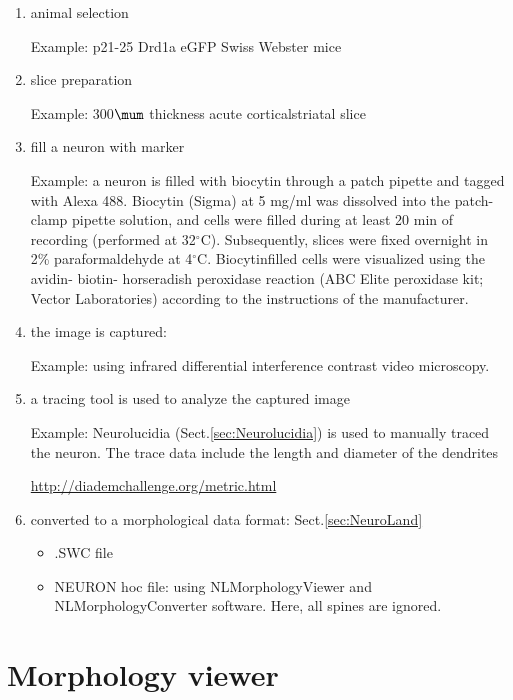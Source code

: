 \begin{enumerate}
  \item animal selection
  
Example: p21-25 Drd1a eGFP Swiss Webster mice
  
  \item slice preparation
  
Example: 300$\mum$ thickness acute corticalstriatal slice 
  
  \item fill a neuron with marker
  
Example: a neuron is filled with biocytin  through a patch pipette and tagged
with Alexa 488.
Biocytin (Sigma) at 5 mg/ml was dissolved into the patch-clamp pipette solution,
and cells were filled during at least 20 min of recording (performed at 32$^\circ$C).
Subsequently, slices were fixed overnight in 2\% paraformaldehyde at 4$^\circ$C.
Biocytinfilled cells were visualized using the avidin- biotin- horseradish
peroxidase reaction (ABC Elite peroxidase kit; Vector Laboratories) according to
the instructions of the manufacturer.
  
  \item the image is captured:
  
Example: using infrared differential interference contrast video microscopy.
  
  \item a tracing tool is used to analyze the captured image
  
Example: Neurolucidia (Sect.\ref{sec:Neurolucidia}) is used to manually traced
the neuron. The trace data include the length and diameter of the dendrites

\url{http://diademchallenge.org/metric.html}

  \item converted to a morphological data format: Sect.\ref{sec:NeuroLand}
 \begin{itemize}
   \item .SWC file
   
   \item NEURON hoc file: using NLMorphologyViewer and NLMorphologyConverter
   software. Here, all spines are ignored.
   
 \end{itemize} 
  
\end{enumerate}

\section{Morphology viewer}
\label{sec:morphology-viewers}

